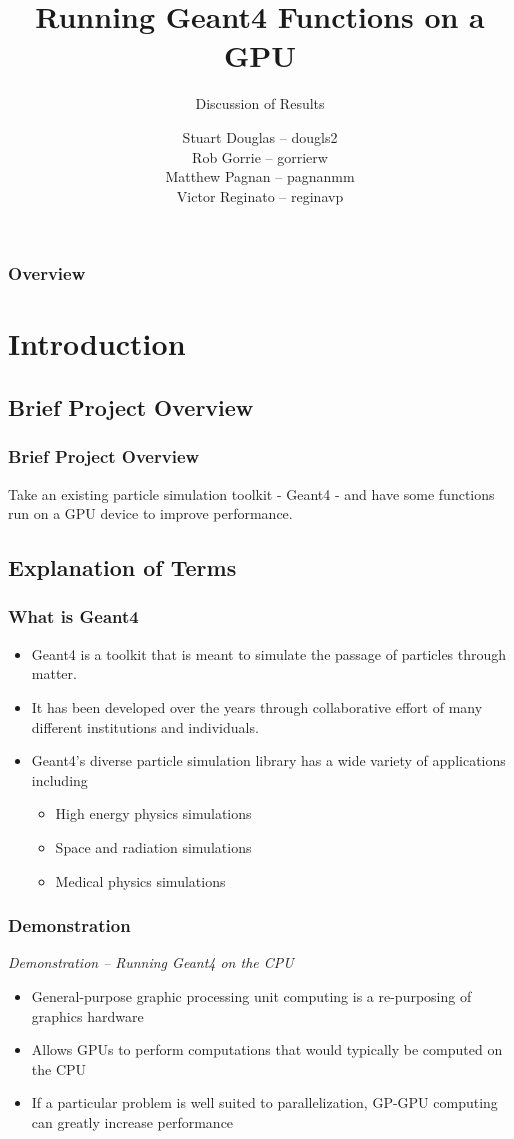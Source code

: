 \documentclass{beamer}
\title[Geant4-GPU (McMaster University)]{Running Geant4 Functions on a GPU}
\subtitle{Discussion of Results}
\institute{McMaster University}
\author[S. Douglas, R. Gorrie, M .Pagnan, V. Reginato]{
Stuart Douglas -- dougls2
\\Rob Gorrie -- gorrierw
\\Matthew Pagnan -- pagnanmm
\\Victor Reginato -- reginavp
}
\begin{document}
\frame{\titlepage}
\begin{frame}
\frametitle{Overview}
\tableofcontents
\end{frame}

\section{Introduction} 

\subsection{Brief Project Overview}
\begin{frame}
\frametitle{Brief Project Overview}
Take an existing particle simulation toolkit - Geant4 - and have some functions run on a GPU device to improve performance.
\end{frame}

\subsection{Explanation of Terms}
\begin{frame}
\frametitle{What is Geant4}
\begin{itemize}
\item Geant4 is a toolkit that is meant to simulate the passage of particles through matter. 
\item It has been developed over the years through collaborative effort of many different institutions and individuals. 
\item Geant4's diverse particle simulation library has a wide variety of applications including
\begin{itemize}
\item High energy physics simulations
\item Space and radiation simulations
\item Medical physics simulations
\end{itemize}
\end{itemize}
\end{frame}

\begin{frame}
\frametitle{Demonstration}
\begin{center}
\emph{Demonstration -- Running Geant4 on the CPU}
% 
\end{center}
\end{frame}

\begin{frame}
\begin{itemize}
\frametitle{What is GP-GPU}
\item General-purpose graphic processing unit computing is a re-purposing of graphics hardware
\item Allows GPUs  to perform computations that would typically be computed on the CPU
\item If a particular problem is well suited to parallelization, GP-GPU computing can greatly increase performance
\end{itemize}
\end{frame}
\end{document}
